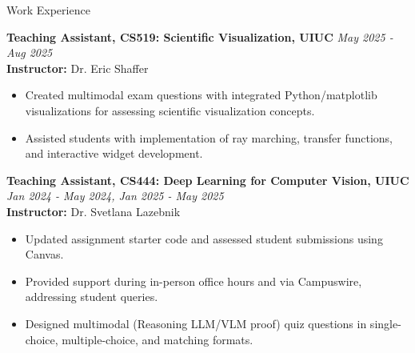 \documentclass{resume} %
\begin{document}
\begin{rSection}{Work Experience}
    \vspace{0.2cm}

    \textbf{Teaching Assistant, CS519: Scientific Visualization, UIUC} \hfill \textit{May 2025 - Aug 2025}
    \\ \textbf{Instructor:} Dr. Eric Shaffer
    \vspace{-0.2cm}
    \begin{itemize}[noitemsep,nolistsep]
        \item Created multimodal exam questions with integrated Python/matplotlib visualizations for assessing scientific visualization concepts.
        \item Assisted students with implementation of ray marching, transfer functions, and interactive widget development.
    \end{itemize}

    \vspace{0.2cm}

    \textbf{Teaching Assistant, CS444: Deep Learning for Computer Vision, UIUC} \hfill \textit{Jan 2024 - May 2024, Jan 2025 - May 2025}
    \\ \textbf{Instructor:} Dr. Svetlana Lazebnik
    \vspace{-0.2cm}
    \begin{itemize}[noitemsep,nolistsep]
        \item Updated assignment starter code and assessed student submissions using Canvas.
        \item Provided support during in-person office hours and via Campuswire, addressing student queries.
        \item Designed multimodal (Reasoning LLM/VLM proof) quiz questions in single-choice, multiple-choice, and matching formats.
    \end{itemize}

\end{rSection}










    
\end{document}

